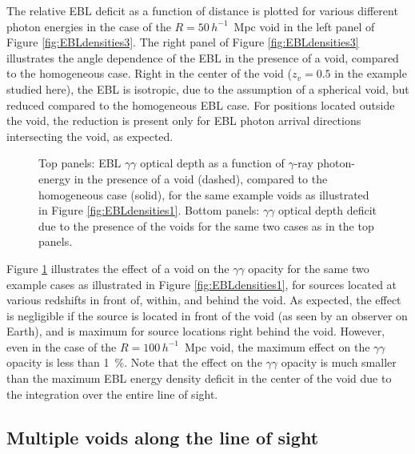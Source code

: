 \documentclass{aastex6}
\begin{document}
The relative EBL deficit as a function of distance is plotted for various different photon energies in 
the case of the $R = 50 \, h^{-1}$~Mpc void in the left panel of Figure \ref{fig:EBLdensities3}. 
The right panel of Figure \ref{fig:EBLdensities3} illustrates the angle dependence of the EBL in the presence
of a void, compared to the homogeneous case. Right in the center of the void ($z_v = 0.5$ 
in the example studied here), the EBL is isotropic, due to the assumption of a spherical void, but reduced compared
to the homogeneous EBL case. For positions located outside the void, the reduction is present only for EBL
photon arrival directions intersecting the void, as expected. 


\begin{figure}[ht]
\caption{Top panels: EBL $\gamma\gamma$ optical depth as a function of $\gamma$-ray photon-energy in the presence 
of a void (dashed), compared to the homogeneous case (solid), for the same example voids as illustrated in
Figure \ref{fig:EBLdensities1}. Bottom panels: $\gamma\gamma$ optical depth deficit due to the presence 
of the voids for the same two cases as in the top panels.
\label{fig:opacity1} }
\end{figure}


Figure \ref{fig:opacity1} illustrates the effect of a void on the $\gamma\gamma$ opacity for the same two 
example cases as illustrated in Figure \ref{fig:EBLdensities1}, for sources located at various redshifts in
front of, within, and behind the void. As expected, the effect is negligible if the source is located in
front of the void (as seen by an observer on Earth), and is maximum for source locations right behind the
void. However, even in the case of the $R = 100 \, h^{-1}$~Mpc void, the maximum effect on the $\gamma\gamma$
opacity is less than 1~\%. Note that the effect on the $\gamma\gamma$ opacity is much smaller than the maximum
EBL energy density deficit in the center of the void due to the integration over the entire line of sight. 


\subsection{Multiple voids along the line of sight}
\label{Mvoid}
\end{document}

